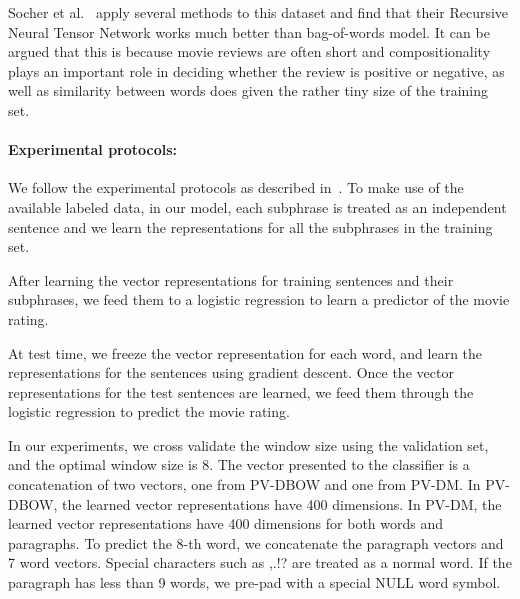 \documentclass{article}
\begin{document}
Socher et al.~\cite{socher13} apply several methods to this dataset
and find that their Recursive Neural Tensor Network works much better
than bag-of-words model. It can be argued that this is because movie
reviews are often short and compositionality plays an important role
in deciding whether the review is positive or negative, as well as
similarity between words does given the rather tiny size of the
training set.

\paragraph{Experimental protocols:}
We follow the experimental protocols as described
in~\cite{socher13}. To make use of the available labeled data, in our
model, each subphrase is treated as an independent sentence and we
learn the representations for all the subphrases in the training set. 

After learning the vector representations for training sentences and
their subphrases, we feed them to a logistic regression to learn
a predictor of the movie rating.

At test time, we freeze the vector representation for each word, and
learn the representations for the sentences using gradient
descent. Once the vector representations for the test sentences are
learned, we feed them through the logistic regression to predict the
movie rating.

In our experiments, we cross validate the window size using the
validation set, and the optimal window size is 8. The vector presented
to the classifier is a concatenation of two vectors, one from PV-DBOW
and one from PV-DM. In PV-DBOW, the learned vector representations
have 400 dimensions. In PV-DM, the learned vector representations have
400 dimensions for both words and paragraphs. To predict the 8-th
word, we concatenate the paragraph vectors and 7 word vectors. Special
characters such as ,.!?  are treated as a normal word. If the
paragraph has less than 9 words, we pre-pad with a special NULL word
symbol.
\end{document}
